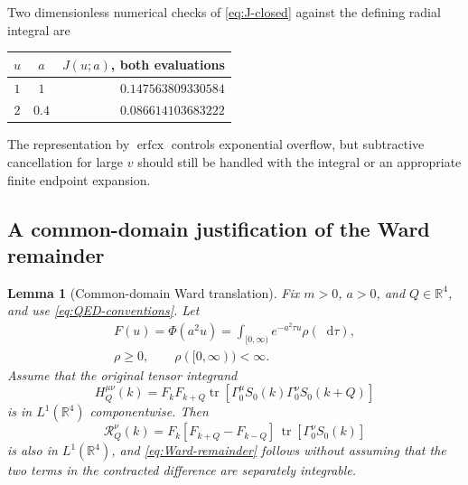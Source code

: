 \documentclass[final,5p,times,twocolumn,numbers,nopreprintline]{elsarticle}
\numberwithin{equation}{section}
\newtheorem{lemma}[theorem]{Lemma}
\theoremstyle{definition}
\theoremstyle{remark}
\newcommand{\dd}{\mathop{}\!\mathrm d}
\newcommand{\Ph}{\Phi}
\newcommand{\Tr}{\operatorname{tr}}
\newcommand{\erfcx}{\operatorname{erfcx}}
\newcommand{\RR}{\mathbb R}
\begin{document}
Two dimensionless numerical checks of
\eqref{eq:J-closed} against the defining radial integral are
\begin{center}
\begin{tabular}{@{}ccr@{}}
\toprule
\(u\)&\(a\)&\(J(u;a)\), both evaluations\\
\midrule
\(1\)&\(1\)&\(0.147563809330584\)\\
\(2\)&\(0.4\)&\(0.086614103683222\)\\
\bottomrule
\end{tabular}
\end{center}
The representation by \(\erfcx\) controls exponential overflow,
but subtractive cancellation for large \(v\) should still be
handled with the integral or an appropriate finite endpoint
expansion.

\subsection{A common-domain justification of the Ward remainder}
\label{sec:Ward-cutoff-proof}

\begin{lemma}[Common-domain Ward translation]
\label{lem:Ward-common-cutoff}
Fix \(m>0\), \(a>0\), and \(Q\in\RR^4\), and use
\eqref{eq:QED-conventions}. Let
\[
\begin{gathered}
 F(u)=\Ph(a^2u)=\int_{[0,\infty)}e^{-a^2\tau u}\rho(\dd\tau),\\
 \rho\geq0,\qquad \rho([0,\infty))<\infty.
\end{gathered}
\]
Assume that the original tensor integrand
\[
 H_Q^{\mu\nu}(k)
 =F_kF_{k+Q}
   \Tr[\Gamma_0^\mu S_0(k)\Gamma_0^\nu S_0(k+Q)]
\]
is in \(L^1(\RR^4)\) componentwise. Then
\[
 \mathcal R_Q^\nu(k)
 =F_k[F_{k+Q}-F_{k-Q}]\,
       \Tr[\Gamma_0^\nu S_0(k)]
\]
is also in \(L^1(\RR^4)\), and
\eqref{eq:Ward-remainder} follows without assuming that the two
terms in the contracted difference are separately integrable.
\end{lemma}
\end{document}
